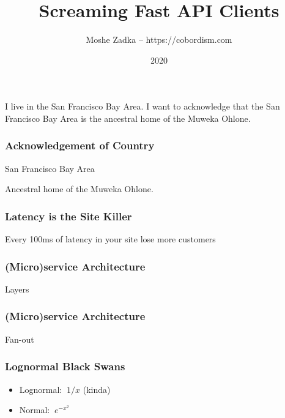 \usepackage{hyperref}
\usepackage{graphicx}
\usepackage{listings}
\usepackage{textcomp}
\usepackage{fancyvrb}

\title{Screaming Fast API Clients}
\author{Moshe Zadka -- https://cobordism.com}
\date{2020}


\begin{titlepage}
\maketitle
\end{titlepage}

\frame{\titlepage}

I live in the San Francisco Bay Area.
I want to acknowledge that the San Francisco Bay Area
is the ancestral home of the Muweka Ohlone.

\begin{frame}
\frametitle{Acknowledgement of Country}

San Francisco Bay Area

Ancestral home of the Muweka Ohlone.

\end{frame}

\begin{frame}
\frametitle{Latency is the Site Killer}

Every 100ms of latency in your site lose more customers

\end{frame}

\begin{frame}
\frametitle{(Micro)service Architecture}

Layers

\end{frame}

\begin{frame}
\frametitle{(Micro)service Architecture}

Fan-out

\end{frame}

\begin{frame}
\frametitle{Lognormal Black Swans}

\begin{itemize}
\item Lognormal: $~1/x$ (kinda)
\item Normal: $~e^{-x^2}$
\end{itemize}

\end{frame}

